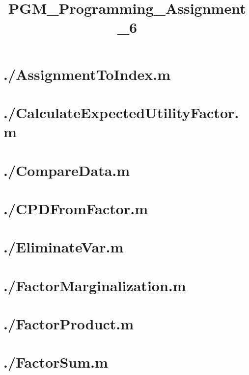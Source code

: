 \documentclass{article}
\title{PGM\_Programming\_Assignment\_6}
\begin{document}
\maketitle
\label{toc}
\tableofcontents
\newpage
\section{./AssignmentToIndex.m}

\section{./CalculateExpectedUtilityFactor.m}

\section{./CompareData.m}

\section{./CPDFromFactor.m}

\section{./EliminateVar.m}

\section{./FactorMarginalization.m}

\section{./FactorProduct.m}

\section{./FactorSum.m}

\end{document}
